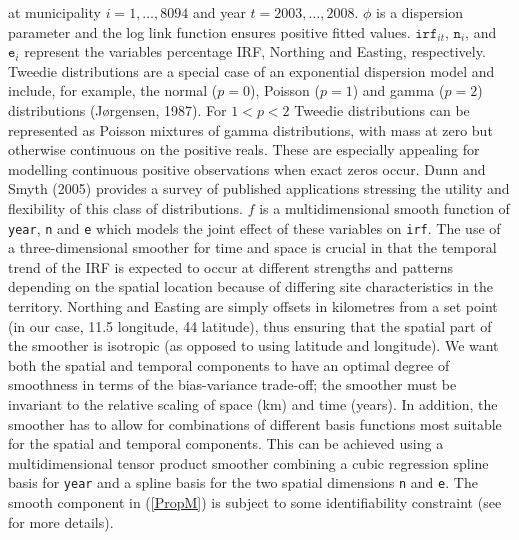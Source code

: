 at municipality $i=1,\ldots,8094$ and year $t=2003,\ldots,2008$. $\phi$ is a dispersion parameter and the log link function ensures positive fitted values. $\texttt{irf}_{it}$, $\texttt{n}_i$, and $\texttt{e}_i$ represent the variables percentage IRF, Northing and Easting, respectively. Tweedie distributions are a special case of an exponential dispersion model and include, for example, the normal ($p=0$), Poisson ($p=1$) and gamma ($p=2$) distributions (J\o rgensen, 1987). For $1<p<2$ Tweedie distributions can be represented as Poisson mixtures of gamma distributions, with mass at zero but otherwise continuous on the positive reals. These are especially appealing for modelling continuous positive observations when exact zeros occur. Dunn and Smyth (2005) provides a survey of published applications stressing the utility and flexibility of this class of distributions. $f$ is a multidimensional smooth function of \texttt{year}, \texttt{n} and \texttt{e} which models the joint effect of these variables on \texttt{irf}. The use of a three-dimensional smoother for time and space is crucial in that the temporal trend of the IRF is expected to occur at different strengths and patterns depending on the spatial location because of differing site characteristics in the territory. Northing and Easting are simply offsets in kilometres from a set point (in our case, 11.5 longitude, 44 latitude), thus ensuring that the spatial part of the smoother is isotropic (as opposed to using latitude and longitude). We want both the spatial and temporal components to have an optimal degree of smoothness in terms of the bias-variance trade-off; the smoother must be invariant to the relative scaling of space (km) and time (years). In addition, the smoother has to allow for combinations of different basis functions most suitable for the spatial and temporal components. This can be achieved using a multidimensional tensor product smoother combining a cubic regression spline basis for \texttt{year} and a spline basis for the two spatial dimensions \texttt{n} and \texttt{e}. The smooth component in (\ref{PropM}) is subject to some identifiability constraint (see \cite{simonbook} for more details).

